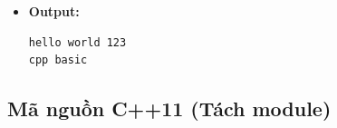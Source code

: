 \begin{itemize}
\begin{itemize}
        \item \textbf{Module 3 (Xoá space đầu/cuối):}

        \begin{itemize}
            \item Nếu cuối chuỗi là space $\rightarrow$ xoá
        \end{itemize}

        \item \textbf{Module 4 (Ghi file output):}

        \begin{itemize}
            \item Ghi từng dòng vào \texttt{normalized.txt}
        \end{itemize}

    \end{itemize}

    \item \textbf{Output:}

\begin{lstlisting}
hello world 123
cpp basic
\end{lstlisting}

\end{itemize}

\subsection{Mã nguồn C++11 (Tách module)}


